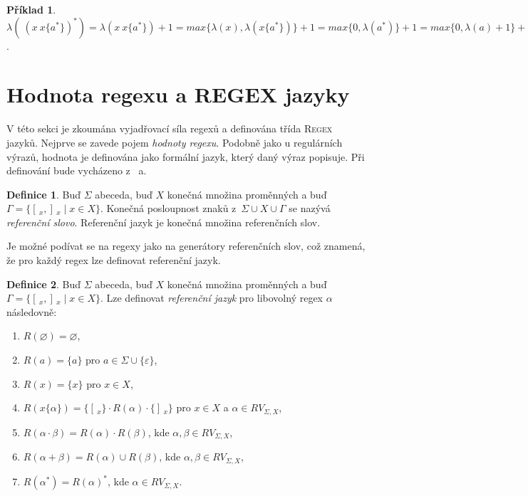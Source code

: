 \documentclass[thesis=B,czech]{FITthesis}[2019/12/23]
\theoremstyle{definition}
\newtheorem{definition}{Definice}[chapter]
\newtheorem{example}{Příklad}[chapter]
\begin{document}
\begin{example}
	$\lambda( \ (x \ x\{a^\ast\})^\ast) = \lambda(x \ x\{a^\ast\})+1=max\{\lambda(x), \lambda(x\{a^\ast\})\}+1=max\{0, \lambda(a^\ast)\}+1=max\{0, \lambda(a)+1\}+1=max\{0, 1\}+1 = 2$.
\end{example}

\section {Hodnota regexu a REGEX jazyky}
V této sekci je zkoumána vyjadřovací síla regexů a definována třída \textsc{Regex} jazyků. Nejprve se zavede pojem \emph{hodnoty regexu}. Podobně jako u regulárních výrazů, hodnota je definována jako formální jazyk, který daný výraz popisuje. Při definování bude vycházeno z~\cite{schmidrefwords} a\cite{fsdeter}.

\begin{definition}
Buď $\Sigma$ abeceda, buď $X$ konečná množina proměnných a buď $\Gamma = \{ [\,_x , ]\,_x \mid x \in X \}$. Konečná posloupnost znaků z~$\Sigma \cup X \cup \Gamma$ se nazývá \emph{referenční slovo}. Referenční jazyk je konečná množina referenčních slov. \cite{schmidrefwords}
\end{definition}

Je možné podívat se na regexy jako na generátory referenčních slov, což znamená, že pro každý regex lze definovat referenční jazyk.

\begin{definition}\label{def:reflan}
Buď $\Sigma$ abeceda, buď $X$ konečná množina proměnných a buď $\Gamma = \{ [\,_x , ]\,_x \mid x \in X \}$. Lze definovat \emph{referenční jazyk} pro libovolný regex $\alpha$ následovně:
\begin{enumerate}
	\item{$R\left(\varnothing\right) = \varnothing$,}
	\item{$R\left(a\right) = \{a\} $ pro $ a \in \Sigma \cup \{ \varepsilon \}$,}
        \item{$R\left(x\right) = \{x\} $ pro $ x \in X$,}
        \item\label{rule:4}{$R\left(x\{ \alpha \}\right) = \{ [\,_x \} \cdot R\left( \alpha \right)  \cdot \{]\,_x \}$ pro $x \in X$ a $\alpha \in RV_{\Sigma, X}$,}
        \item{$R\left(\alpha\cdot\beta\right) = R\left(\alpha\right)\cdot R\left(\beta\right)$, kde $\alpha, \beta \in RV_{\Sigma, X}$,}
        \item{$R\left(\alpha + \beta\right) = R\left(\alpha\right)\cup R\left(\beta\right)$, kde $\alpha, \beta \in RV_{\Sigma, X}$,}
        \item{$R\left(\alpha^\ast\right) = R\left(\alpha\right)^\ast$, kde $\alpha \in RV_{\Sigma, X}$. \cite{fsdeter}}
\end{enumerate}
\end{definition}
\end{document}
